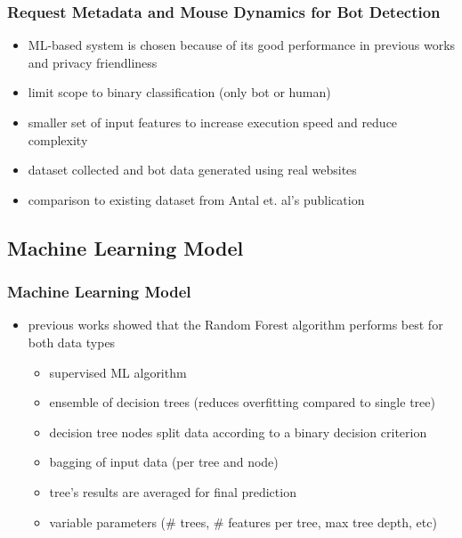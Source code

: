 \documentclass[t,aspectratio=169,table]{beamer}
\begin{document}
\begin{frame}
\frametitle{Request Metadata and Mouse Dynamics for Bot Detection}

\begin{itemize}
    \item ML-based system is chosen because of its good performance in previous works and privacy friendliness
    \item limit scope to binary classification (only bot or human)
    \item smaller set of input features to increase execution speed and reduce complexity
    \item dataset collected and bot data generated using real websites
    \item comparison to existing dataset from Antal et. al's publication \cite{9111596}
\end{itemize}

\end{frame}

\subsection{Machine Learning Model}
\begin{frame}
\frametitle{Machine Learning Model}

\begin{itemize}
    \item previous works showed that the Random Forest algorithm performs best for both data types
    \begin{itemize}
        \item supervised ML algorithm
        \item ensemble of decision trees (reduces overfitting compared to single tree)
        \item decision tree nodes split data according to a binary decision criterion
        \item bagging of input data (per tree and node)
        \item tree's results are averaged for final prediction
        \item variable parameters (\# trees, \# features per tree, max tree depth, etc)
    \end{itemize}
\end{itemize}

\end{frame}
\end{document}
